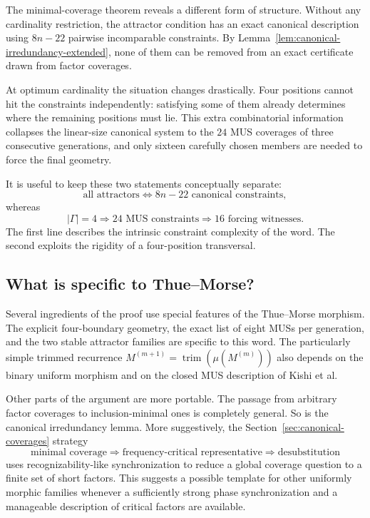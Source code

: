 \documentclass[11pt,a4paper]{article}
\theoremstyle{definition}\newtheorem{definition}[theorem]{Definition}
\theoremstyle{remark}\newtheorem{remark}[theorem]{Remark}
\begin{document}
The minimal-coverage theorem reveals a different form of structure.  Without any cardinality restriction, the attractor condition has an exact canonical description using
$
 8n-22
$
pairwise incomparable constraints.  By Lemma~\ref{lem:canonical-irredundancy-extended}, none of them can be removed from an exact certificate drawn from factor coverages.

At optimum cardinality the situation changes drastically.  Four positions cannot hit the constraints independently: satisfying some of them already determines where the remaining positions must lie.  This extra combinatorial information collapses the linear-size canonical system to the $24$ MUS coverages of three consecutive generations, and only sixteen carefully chosen members are needed to force the final geometry.

It is useful to keep these two statements conceptually separate:
\[
 \boxed{\text{all attractors}}
 \Longleftrightarrow
 \boxed{8n-22\text{ canonical constraints}},
\]
whereas
\[
 \boxed{|\Gamma|=4}
 \Longrightarrow
 \boxed{24\text{ MUS constraints}}
 \Longrightarrow
 \boxed{16\text{ forcing witnesses}}.
\]
The first line describes the intrinsic constraint complexity of the word.  The second exploits the rigidity of a four-position transversal.

\subsection{What is specific to Thue--Morse?}
\label{subsec:specific-vs-portable}

Several ingredients of the proof use special features of the Thue--Morse morphism.  The explicit four-boundary geometry, the exact list of eight MUSs per generation, and the two stable attractor families are specific to this word.  The particularly simple trimmed recurrence
$
 M^{(m+1)}=\operatorname{trim}(\mu(M^{(m)}))
$
also depends on the binary uniform morphism and on the closed MUS description of Kishi et al.

Other parts of the argument are more portable.  The passage from arbitrary factor coverages to inclusion-minimal ones is completely general.  So is the canonical irredundancy lemma.  More suggestively, the Section~\ref{sec:canonical-coverages} strategy
\[
 \text{minimal coverage}
 \Rightarrow
 \text{frequency-critical representative}
 \Rightarrow
 \text{desubstitution}
\]
uses recognizability-like synchronization to reduce a global coverage question to a finite set of short factors.  This suggests a possible template for other uniformly morphic families whenever a sufficiently strong phase synchronization and a manageable description of critical factors are available.
\end{document}
